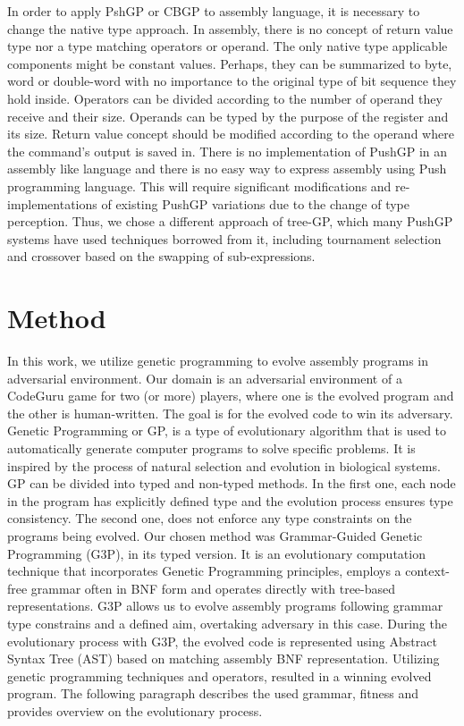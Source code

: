 \documentclass[dvipsnames,format=sigconf,anonymous=true,review=true]{acmart}
\begin{document}
In order to apply PshGP or CBGP to assembly language, it is necessary to change the native type approach. In assembly, there is no concept of return value type nor a type matching operators or operand. The only native type applicable components might be constant values. Perhaps, they can be summarized to byte, word or double-word with no importance to the original type of bit sequence they hold inside. Operators can be divided according to the number of operand they receive and their size. Operands can be typed by the purpose of the register and its size. Return value concept should be modified according to the operand where the command's output is saved in. There is no implementation of PushGP in an assembly like language and there is no easy way to express assembly using Push programming language. This will require significant modifications and re-implementations of existing PushGP variations due to the change of type perception. Thus, we chose a different approach of tree-GP, which many PushGP systems have used techniques borrowed from it, including tournament selection and crossover based on the swapping of
sub-expressions.


\section{Method}
In this work, we utilize genetic programming to evolve assembly programs in adversarial environment. Our domain is an adversarial environment of a CodeGuru game for two (or more) players, where one is the evolved program and the other is human-written. The goal is for the evolved code to win its adversary.
Genetic Programming or GP, is a type of evolutionary algorithm that is used to automatically generate computer programs to solve specific problems. It is inspired by the process of natural selection and evolution in biological systems. GP can be divided into typed and non-typed methods. In the first one, each node in the program has explicitly defined type and the evolution process ensures type consistency. The second one, does not enforce any type constraints on the programs being evolved. Our chosen method was Grammar-Guided Genetic Programming (G3P), in its typed version. It is an evolutionary computation technique that incorporates Genetic Programming principles, employs a context-free grammar often in BNF form and operates directly with tree-based representations. G3P allows us to evolve assembly programs following grammar type constrains and a defined aim, overtaking adversary in this case. During the evolutionary process with G3P, the evolved code is represented using Abstract Syntax Tree (AST) based on matching assembly BNF representation. Utilizing genetic programming techniques and operators, resulted in a winning evolved program. The following paragraph describes the used grammar, fitness and provides overview on the evolutionary process.
\end{document}
